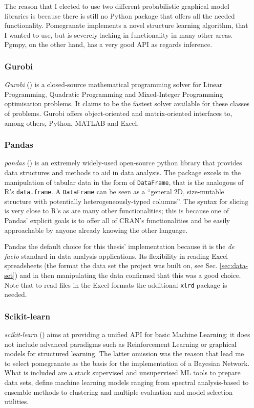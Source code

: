 The reason that I elected to use two different probabilistic graphical model libraries is because there is still no Python package that offers all the needed functionality.
Pomegranate implements a novel structure learning algorithm, that I wanted to use, but is severely lacking in functionality in many other areas.
Pgmpy, on the other hand, has a very good API as regards inference.

\subsubsection{Gurobi}
\textit{Gurobi} (\cite{gurobi}) is a closed-source mathematical programming solver for Linear Programming, Quadratic Programming and Mixed-Integer Programming optimisation problems.
It claims to be the fastest solver available for these classes of problems.
Gurobi offers object-oriented and matrix-oriented interfaces to, among others, Python, MATLAB and Excel.

\subsubsection{Pandas}
\textit{pandas} (\cite{pandas}) is an extremely widely-used open-source python library that provides data structures and methods to aid in data analysis.
The package excels in the manipulation of tabular data in the form of \texttt{DataFrame}, that is the analogous of R's \texttt{data.frame}.
A \texttt{DataFrame} can be seen as a \enquote{general 2D, size-mutable structure with potentially heterogeneously-typed columns}.
The syntax for slicing is very close to R's as are many other functionalities; this is because one of Pandas' explicit goals is to offer all of CRAN's functionalities and be easily approachable by anyone already knowing the other language.

Pandas the default choice for this thesis' implementation because it is the \textit{de facto} standard in data analysis applications.
Its flexibility in reading Excel spreadsheets (the format the data set the project was built on, see Sec. \ref{sec:data-set}) and in then manipulating the data confirmed that this was a good choice.
Note that to read files in the Excel formats the additional \texttt{xlrd} package is needed.

\subsubsection{Scikit-learn}
\textit{scikit-learn} (\cite{scikitlearn}) aims at providing a unified API for basic Machine Learning; it does not include advanced paradigms such as Reinforcement Learning or graphical models for structured learning.
The latter omission was the reason that lead me to select pomegranate as the basis for the implementation of a Bayesian Network.
What is included are a stack supervised and unsupervised ML tools to prepare data sets, define machine learning models ranging from spectral analysis-based to ensemble methods to clustering and multiple evaluation and model selection utilities.

